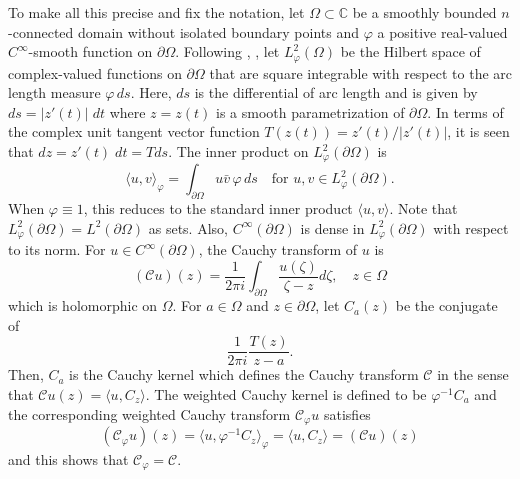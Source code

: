\documentclass[11pt, reqno]{amsart}
\numberwithin{equation}{section}
\newcommand{\mbb}{\mathbb}
\newcommand{\pa}{\partial}
\newcommand{\Om}{\Omega}
\begin{document}
To make all this precise and fix the notation, let $\Omega \subset \mbb C$ be a smoothly bounded $n$-connected domain without isolated boundary points and $\varphi$ a positive real-valued $C^{\infty}$-smooth function on $\pa \Om$. Following \cite{Be0}, \cite{Be1}, let $L^2_{\varphi}(\Omega)$ be the Hilbert space of complex-valued functions on $\partial\Omega$ that are square integrable with respect to the arc length measure $\varphi\,ds$. Here, $ds$ is the differential of arc length and is given by  $ds = \vert z'(t) \vert \; dt$ where $z = z(t)$ is a smooth parametrization of $\partial \Omega$. In terms of the complex unit tangent vector function $T(z(t)) = z'(t) / \vert z'(t) \vert$, it is seen that $dz = z'(t) \; dt = T ds$. The inner product on $L^2_{\varphi}(\partial\Omega)$ is
\begin{equation}
\langle u,v\rangle_{\varphi}=\int_{\partial\Omega}u\bar{v}\,\varphi\,ds\quad \text{for }u,v\in L^2_{\varphi}(\partial\Omega).
\end{equation}
When $\varphi \equiv 1$, this reduces to the standard inner product $\langle u, v \rangle$. Note that $L^2_{\varphi}(\partial\Omega)=L^2(\partial\Omega)$ as sets. Also, $C^{\infty}(\partial\Omega)$ is dense in $L^2_{\varphi}(\partial\Omega)$ with respect to its norm. For $u\in C^{\infty}(\partial\Omega)$, the Cauchy transform of $u$ is 
\begin{equation}
(\mathcal{C}u)(z)=\frac{1}{2\pi i}\int_{\partial\Omega}\frac{u(\zeta)}{\zeta-z}d\zeta,\quad z\in\Omega
\end{equation}
which is holomorphic on $\Omega$. For $a \in \Omega$ and $z \in \partial \Omega$, let $C_a(z)$ be the conjugate of 
\[
\frac{1}{2 \pi i} \frac{T(z)}{z-a}.
\]
Then, $C_a$ is the Cauchy kernel which defines the Cauchy transform $\mathcal C$ in the sense that $\mathcal C u(z) = \langle u, C_z \rangle$. The weighted Cauchy kernel is defined to be $\varphi^{-1} C_a$ and the corresponding weighted Cauchy transform $\mathcal C_{\varphi}u$ satisfies
\[
(\mathcal C_{\varphi} u)(z) = \langle u, \varphi^{-1} C_z \rangle_{\varphi} = \langle u, C_z \rangle = (\mathcal C u)(z)
\]
and this shows that $\mathcal C_{\varphi} = \mathcal C$.

\medskip
\end{document}
